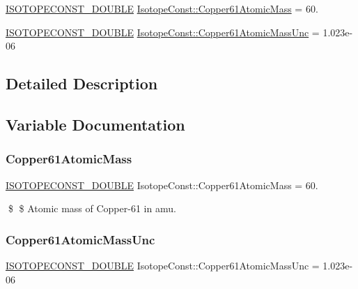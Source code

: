 \begin{DoxyCompactItemize}
\item 
\mbox{\hyperlink{group___isotope_const-_macros_ga8f45a7272ce02c0b4c65c44636ed719a}{I\+S\+O\+T\+O\+P\+E\+C\+O\+N\+S\+T\+\_\+\+D\+O\+U\+B\+LE}} \mbox{\hyperlink{group___isotope_const-_copper-_cu61_ga864d46023c9af05227797d89a71e86c3}{Isotope\+Const\+::\+Copper61\+Atomic\+Mass}} = 60.
\item 
\mbox{\hyperlink{group___isotope_const-_macros_ga8f45a7272ce02c0b4c65c44636ed719a}{I\+S\+O\+T\+O\+P\+E\+C\+O\+N\+S\+T\+\_\+\+D\+O\+U\+B\+LE}} \mbox{\hyperlink{group___isotope_const-_copper-_cu61_ga56898320776480b8a669739a5bab33f1}{Isotope\+Const\+::\+Copper61\+Atomic\+Mass\+Unc}} = 1.\+023e-\/06
\end{DoxyCompactItemize}


\subsection{Detailed Description}


\subsection{Variable Documentation}
\mbox{\label{group___isotope_const-_copper-_cu61_ga864d46023c9af05227797d89a71e86c3}} 
\subsubsection{\texorpdfstring{Copper61\+Atomic\+Mass}{Copper61AtomicMass}}
{\footnotesize\ttfamily \mbox{\hyperlink{group___isotope_const-_macros_ga8f45a7272ce02c0b4c65c44636ed719a}{I\+S\+O\+T\+O\+P\+E\+C\+O\+N\+S\+T\+\_\+\+D\+O\+U\+B\+LE}} Isotope\+Const\+::\+Copper61\+Atomic\+Mass = 60.}

\$ \$ Atomic mass of Copper-\/61 in amu. \mbox{\label{group___isotope_const-_copper-_cu61_ga56898320776480b8a669739a5bab33f1}} 
\subsubsection{\texorpdfstring{Copper61\+Atomic\+Mass\+Unc}{Copper61AtomicMassUnc}}
{\footnotesize\ttfamily \mbox{\hyperlink{group___isotope_const-_macros_ga8f45a7272ce02c0b4c65c44636ed719a}{I\+S\+O\+T\+O\+P\+E\+C\+O\+N\+S\+T\+\_\+\+D\+O\+U\+B\+LE}} Isotope\+Const\+::\+Copper61\+Atomic\+Mass\+Unc = 1.\+023e-\/06}

